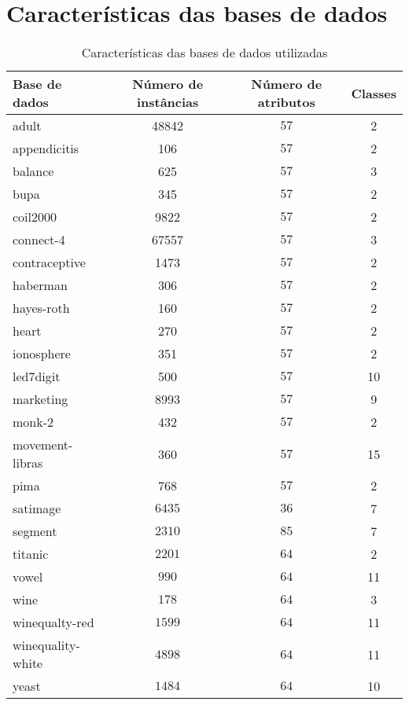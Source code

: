 \documentclass[a4paper, 12pt]{article}
\begin{document}
\section{Características das bases de dados}
\begin{table}[h!]
  \begin{center}
    \caption{Características das bases de dados utilizadas}
    \label{tab:table10}
    \begin{tabular}{l|c|c|c}
      \textbf{Base de dados} & \textbf{ Número de instâncias } & \textbf{Número de atributos} & \textbf{Classes} \\
      \hline
      adult \cite{adult} & 48842  & $57$ & 2 \\
      \hline
      appendicitis \cite{Appendicitis} & 106  & $57$ & 2 \\
      \hline
      balance \cite{Balance} & 625  & $57$ & 3 \\
      \hline
      bupa \cite{Bupa} & 345  & $57$ & 2 \\
      \hline
      coil2000 \cite{coil2000} & 9822  & $57$ & 2 \\
      \hline
      connect-4 \cite{connect-4} & 67557  & $57$ & 3 \\
      \hline
      contraceptive \cite{contraceptive} & 1473  & $57$ & 2 \\
      \hline
      haberman \cite{haberman} & 306  & $57$ & 2 \\
      \hline
      hayes-roth \cite{hayes} & 160  & $57$ & 2 \\
      \hline
      heart \cite{heart} & 270  & $57$ & 2 \\
      \hline
      ionosphere \cite{Ionosphere} & 351  & $57$ & 2 \\
      \hline
      led7digit \cite{led7digit} & 500  & $57$ & 10 \\
      \hline
      marketing \cite{Marketing} & 8993  & $57$ & 9 \\
      \hline
      monk-2 \cite{monk-2} & 432  & $57$ & 2 \\
      \hline
      movement-libras \cite{libras} & 360  & $57$ & 15 \\
      \hline
      pima \cite{pima} & 768  & $57$ & 2 \\
      \hline
      satimage\cite{satimage} & $6435$ & $36$ & 7 \\
      \hline
      segment\cite{segment} & $2310$ & $85$ & 7 \\
      \hline
      titanic\cite{titanic} & $2201$ & $64$ & 2 \\
      \hline
      vowel\cite{vowel} & $990$ & $64$ & 11 \\
      \hline
      wine\cite{wine} & $178$ & $64$ & 3 \\
      \hline
      winequalty-red\cite{red-wine} & $1599$ & $64$ & 11 \\
      \hline
      winequality-white\cite{white-wine} & $4898$ & $64$ & 11 \\
      \hline
      yeast\cite{yeast} & $1484$ & $64$ & 10 \\


\end{tabular}
\end{center}
\end{table}
\end{document}
